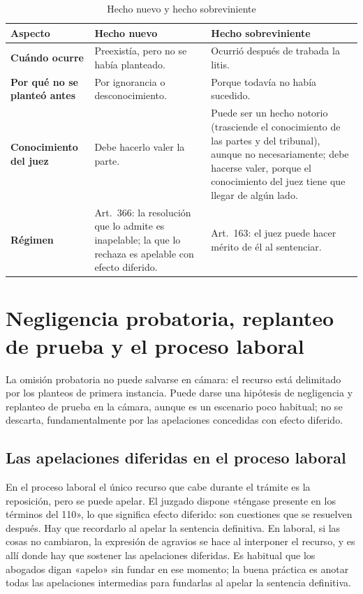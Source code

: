 \documentclass[12pt,oneside]{book}
\begin{document}
\begin{table}[H]
\centering
\caption{Hecho nuevo y hecho sobreviniente}
\small
\begin{tabularx}{\textwidth}{>{\raggedright\arraybackslash}p{2.8cm} Y Y}
\toprule
\textbf{Aspecto} & \textbf{Hecho nuevo} & \textbf{Hecho sobreviniente} \\
\midrule
\textbf{Cuándo ocurre} & Preexistía, pero no se había planteado. & Ocurrió después de trabada la litis. \\
\textbf{Por qué no se planteó antes} & Por ignorancia o desconocimiento. & Porque todavía no había sucedido. \\
\textbf{Conocimiento del juez} & Debe hacerlo valer la parte. & Puede ser un hecho notorio (trasciende el conocimiento de las partes y del tribunal), aunque no necesariamente; debe hacerse valer, porque el conocimiento del juez tiene que llegar de algún lado. \\
\textbf{Régimen} & Art.~366: la resolución que lo admite es inapelable; la que lo rechaza es apelable con efecto diferido. & Art.~163: el juez puede hacer mérito de él al sentenciar. \\
\bottomrule
\end{tabularx}
\end{table}

\section{Negligencia probatoria, replanteo de prueba y el proceso laboral}

La omisión probatoria no puede salvarse en cámara: el recurso está delimitado por los planteos de primera instancia. Puede darse una hipótesis de negligencia y replanteo de prueba en la cámara, aunque es un escenario poco habitual; no se descarta, fundamentalmente por las apelaciones concedidas con efecto diferido.


\subsection{Las apelaciones diferidas en el proceso laboral}

En el proceso laboral el único recurso que cabe durante el trámite es la reposición, pero se puede apelar. El juzgado dispone «téngase presente en los términos del 110», lo que significa efecto diferido: son cuestiones que se resuelven después. Hay que recordarlo al apelar la sentencia definitiva. En laboral, si las cosas no cambiaron, la expresión de agravios se hace al interponer el recurso, y es allí donde hay que sostener las apelaciones diferidas. Es habitual que los abogados digan «apelo» sin fundar en ese momento; la buena práctica es anotar todas las apelaciones intermedias para fundarlas al apelar la sentencia definitiva.
\end{document}
